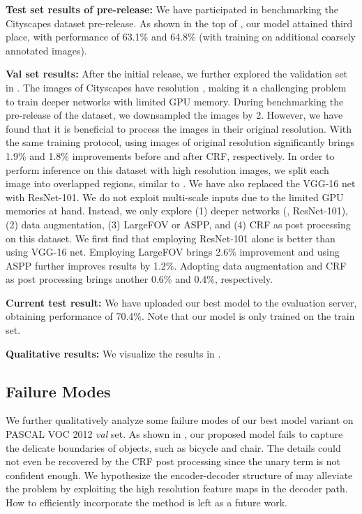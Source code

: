 \textbf{Test set results of pre-release:} We have participated in benchmarking
the Cityscapes dataset pre-release. As shown in the top of ,
our model attained third place, with performance of 63.1\% and 64.8\% (with training on
additional coarsely annotated images). 

\textbf{Val set results:} After the initial release, we further explored the
validation set in . The images of Cityscapes
have resolution , making it a challenging problem to train deeper
networks with limited GPU memory. During benchmarking the pre-release of the dataset,
we downsampled the images by 2. However, we have found that it is beneficial to
process the images in their original resolution. With the same training protocol,
using images of original resolution significantly brings 1.9\% and 1.8\% improvements
before and after CRF, respectively. In order to perform inference on this dataset with
high resolution images, we split each image into overlapped regions, similar to
\cite{Cordts2016Cityscapes}. We have also replaced the VGG-16 net with ResNet-101.
We do not exploit multi-scale inputs due to the limited GPU memories at hand.
Instead, we only explore (1) deeper networks (\ie, ResNet-101), (2) data augmentation,
(3) LargeFOV or ASPP, and (4) CRF as post processing on this dataset. We first find
that employing ResNet-101 alone is better than using VGG-16 net. Employing LargeFOV
brings 2.6\% improvement and using ASPP further improves results by 1.2\%.
Adopting data augmentation and CRF as post processing brings another 0.6\% and 0.4\%,
respectively.

\textbf{Current test result:} We have uploaded our best model to the evaluation server,
obtaining performance of 70.4\%. Note that our model is only trained on the train set.

\textbf{Qualitative results:} We visualize the results in .

\subsection{Failure Modes}
We further qualitatively analyze some failure modes of our best model variant on PASCAL VOC 2012 {\it val} set. As shown in , our proposed model fails to capture the delicate boundaries of objects, such as bicycle and chair. The details could not even be recovered by the CRF post processing since the unary term is not confident enough. We hypothesize the encoder-decoder structure of 
\cite{badrinarayanan2015segnet, ronneberger2015u} may alleviate the problem by exploiting the high resolution feature maps in the decoder path. How to efficiently incorporate the method is left as a future work.



